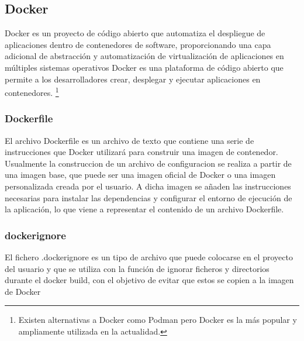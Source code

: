 \documentclass[12pt, a4paper, twoside]{article}
\begin{document}
\subsection{Docker}
\label{sec:Docker}
Docker \cite{docker} es un proyecto de código abierto que automatiza el despliegue de aplicaciones dentro de contenedores de software, proporcionando una capa adicional de abstracción y automatización de virtualización de aplicaciones en múltiples sistemas operativos
Docker es una plataforma de código abierto que permite a los desarrolladores crear, desplegar y ejecutar aplicaciones en contenedores. 
\footnote{Existen alternativas a Docker como Podman \cite{podman} pero Docker es la más popular y ampliamente utilizada en la actualidad.}
\subsubsection{Dockerfile}
\label{sec:Dockerfile}
El archivo Dockerfile \cite{dockerfile_concepts} es un archivo de texto que contiene una serie de instrucciones que Docker utilizará para construir una imagen de contenedor.
Usualmente la construccion de un archivo de configuracion se realiza a partir de una imagen base, que puede ser una imagen oficial de Docker o una imagen personalizada creada por el usuario.
A dicha imagen se añaden las instrucciones necesarias para instalar las dependencias y configurar el entorno de ejecución de la aplicación, lo que viene a representar el contenido de un archivo Dockerfile.
\subsubsection{dockerignore}
\label{sec:dockerignore}
El fichero .dockerignore \cite{dockerignore} es un tipo de archivo que puede colocarse en el proyecto del usuario y que se utiliza con la función de ignorar ficheros y directorios durante el docker build, con el objetivo de evitar que estos se copien a la imagen de Docker 
\newpage
\end{document}
